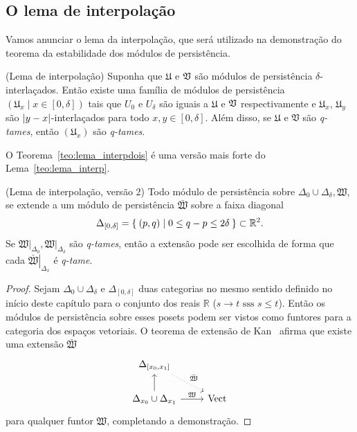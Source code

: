 \subsection{O lema de interpolação}

Vamos anunciar o lema da interpolação, que será utilizado na 
demonstração do teorema da estabilidade dos módulos de persistência.

\begin{lema}{(Lema de interpolação)}\label{teo:lema_interp}
Suponha que $\mathfrak{U}$ e $\mathfrak{V}$ são módulos de persistência
$\delta$-interlaçados. Então existe uma família de módulos de 
persistência $(\mathfrak{U}_x \mid x \in [0,\delta])$ tais que 
$U_0$ e $U_\delta$ são iguais a $\mathfrak{U}$ e $\mathfrak{V}$ 
respectivamente e $\mathfrak{U}_x$, $\mathfrak{U}_y$ são 
$\left\lvert y-x\right\rvert$-interlaçados para todo $x,y \in [0,\delta]$. Além disso,
se $\mathfrak{U}$ e $\mathfrak{V}$ são \textit{q-tames}, então 
$(\mathfrak{U}_x)$ são \textit{q-tames}.
\end{lema}

O Teorema~\ref{teo:lema_interpdois} é uma versão mais forte do 
Lema~\ref{teo:lema_interp}. 
\begin{teo}{(Lema de interpolação, versão 2)}\label{teo:lema_interpdois}
Todo módulo de persistência sobre $\Delta_0 \cup 
\Delta_\delta, \mathfrak{W}$, se extende a um módulo de persistência 
$\bar{\mathfrak{W}}$ sobre a faixa diagonal
\begin{equation*}
    \Delta_{[0, \delta]} = \Set{(p,q) | 0 \leq q - p \leq 2\delta}
    \subset \mathbb{R}^2.
\end{equation*} 
Se $\left.\mathfrak{W}\right|_{\Delta_0}, \left.\mathfrak{W}
\right|_{\Delta_\delta}$ são \textit{q-tames}, então a extensão
pode ser escolhida de forma que cada $\left.\bar{\mathfrak{W}}
\right|_{\Delta_x}$ é \textit{q-tame}. 
\end{teo}
\begin{proof}
    Sejam $\Delta_0 \cup \Delta_\delta$ e $\Delta_{[0,\delta]}$ duas 
    categorias no mesmo sentido definido no início deste capítulo para
    o conjunto dos reais $\mathbb{R}$ ($s \to t \text{ sss } s \leq t$).
    Então os módulos de persistência sobre esses posets podem ser vistos
    como funtores para a categoria dos espaços vetoriais. O teorema
    de extensão de Kan~\cite{MacLane1978} afirma que existe uma extensão
    $\bar{\mathfrak{W}}$ 
    \begin{equation*}
        \begin{tikzcd}
            {\Delta_{[x_0,x_1]}} \arrow[dotted]{rd}{\bar{\mathfrak{W}}}     &             \\
            \Delta_{x_0} \cup \Delta_{x_1} \arrow{u} \arrow{r}{\mathfrak{W}}  & \text{Vect}
        \end{tikzcd}
    \end{equation*}
    para qualquer funtor $\mathfrak{W}$, completando
    a demonstração. 
\end{proof}


